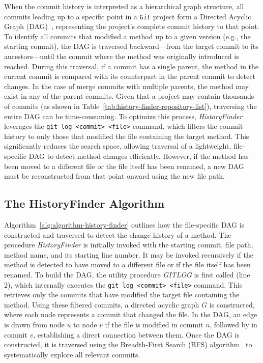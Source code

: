 When the commit history is interpreted as a hierarchical graph structure, all commits leading up to a specific point in a \texttt{Git} project form a Directed Acyclic Graph (DAG)~\cite{geisshirt_git_2018}, representing the project's complete commit history to that point. To identify all commits that modified a method up to a given version (e.g., the starting commit), the DAG is traversed backward—from the target commit to its ancestors—until the commit where the method was originally introduced is reached. During this traversal, if a commit has a single parent, the method in the current commit is compared with its counterpart in the parent commit to detect changes. In the case of merge commits with multiple parents, the method may exist in any of the parent commits. Given that a project may contain thousands of commits (as shown in Table~\ref{tab:history-finder-repository-list}), traversing the entire DAG can be time-consuming. To optimize this process, \textit{HistoryFinder} leverages the \texttt{git log <commit> <file>} command, which filters the commit history to only those that modified the file containing the target method. This significantly reduces the search space, allowing traversal of a lightweight, file-specific DAG to detect method changes efficiently. However, if the method has been moved to a different file or the file itself has been renamed, a new DAG must be reconstructed from that point onward using the new file path.

\subsection{The HistoryFinder Algorithm}
Algorithm~\ref{alg:algorithm-history-finder} outlines how the file-specific DAG is constructed and traversed to detect the change history of a method. The procedure \textit{HistoryFinder} is initially invoked with the starting commit, file path, method name, and its starting line number. It may be invoked recursively if the method is detected to have moved to a different file or if the file itself has been renamed. To build the DAG, the utility procedure \textit{GITLOG} is first called (line 2), which internally executes the \texttt{git log <commit> <file>} command. This retrieves only the commits that have modified the target file containing the method. Using these filtered commits, a directed acyclic graph \( G \) is constructed, where each node represents a commit that changed the file. In the DAG, an edge is drawn from node $u$ to node $v$ if the file is modified in commit $u$, followed by in commit $v$, establishing a direct connection between them. Once the DAG is constructed, it is traversed using the Breadth-First Search (BFS) algorithm~\cite{cormen_introduction_2022} to systematically explore all relevant commits.

